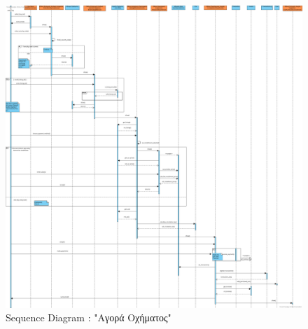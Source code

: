\documentclass{../ol-softwaremanual}
\begin{document}
	
	\begin{figure}[htbp!]
		\centering
		\includegraphics[scale=0.19]{img/seq_buy_car.png}
		\caption{\en Sequence Diagram : "\gr Αγορά Οχήματος\en"\gr}
	\end{figure}
	
	
	\newpage
	\centering
\end{document}
